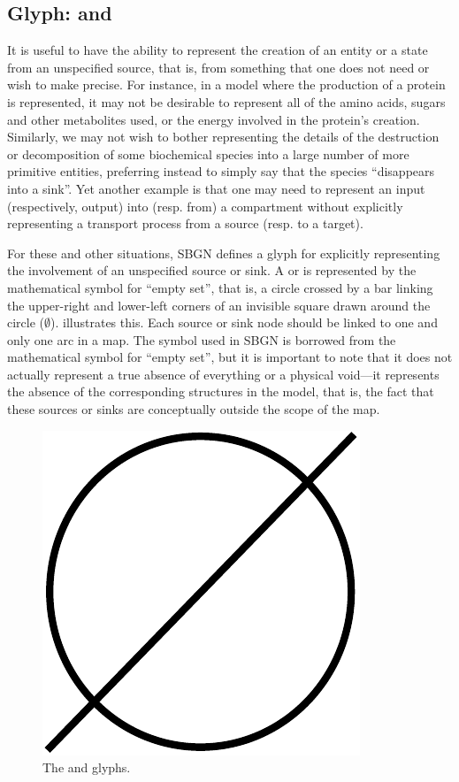 
\subsection{Glyph:  and }
\label{sec:sourceSink}

It is useful to have the ability to represent the creation of an entity or
a state from an unspecified source, that is, from something that one does
not need or wish to make precise.  For instance, in a model where the
production of a protein is represented, it may not be desirable to
represent all of the amino acids, sugars and other metabolites used, or the
energy involved in the protein's creation.  Similarly, we may not wish to
bother representing the details of the destruction or decomposition of some
biochemical species into a large number of more primitive entities,
preferring instead to simply say that the species ``disappears into a
sink''.  Yet another example is that one may need to represent an input
(respectively, output) into (resp. from) a compartment without explicitly
representing a transport process from a source (resp. to a target).

For these and other situations, SBGN defines a glyph for explicitly
representing the involvement of an unspecified source or sink. A  or  is represented by the mathematical symbol for ``empty
set'', that is, a circle crossed by a bar linking the upper-right and
lower-left corners of an invisible square drawn around the circle ($\emptyset$).
 illustrates this. Each source or sink node should be linked to one
and only one arc in a map. The symbol
used in SBGN is borrowed from the mathematical symbol for ``empty set'',
but it is important to note that it does not actually represent a true
absence of everything or a physical void---it represents the absence of the
corresponding structures in the model, that is, the fact that these sources
or sinks are conceptually outside the scope of the map. 

\begin{figure}[H]
  \centering
  \includegraphics[scale = 0.3]{images/sourceSink}
  \caption{The  and  glyphs.}
  \label{fig:sourceSink}
\end{figure}


